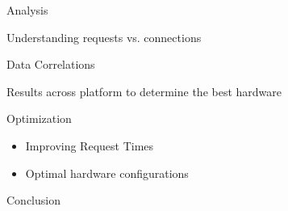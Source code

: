 \documentclass[xcolor=dvipsnames,14pt]{beamer}
\begin{document}
\begin{frame}{Analysis}
  \item Understanding requests vs. connections
  \item Data Correlations
  \item Results across platform to determine the best hardware
\end{frame}

\begin{frame}{Optimization}
  \begin{itemize}
    \item Improving Request Times
    \item Optimal hardware configurations
  \end{itemize}
\end{frame}

\begin{frame}{Conclusion}
\end{frame}
\end{document}
